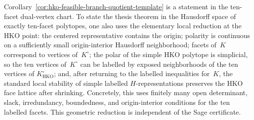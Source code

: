 \begin{remark}
\label{rem:hko-hausdorff-theorem-domain}
Corollary~\ref{cor:hko-feasible-branch-quotient-template} is a statement in the
ten-facet dual-vertex chart. To state the thesis theorem in the Hausdorff space
of exactly ten-facet polytopes, one also uses the elementary local reduction at
the HKO point: the centered representative contains the origin; polarity is
continuous on a sufficiently small origin-interior Hausdorff neighborhood;
facets of~$K$ correspond to vertices of~$K^\circ$; the polar of the simple HKO
polytope is simplicial, so the ten vertices of~$K^\circ$ can be labelled by
exposed neighborhoods of the ten vertices of $K_{\mathrm{HKO}}^\circ$; and,
after returning to the labelled inequalities for~$K$, the standard local
stability of simple labelled $H$-representations preserves the HKO face lattice
after shrinking. Concretely, this uses finitely many open determinant, slack,
irredundancy, boundedness, and origin-interior conditions for the ten labelled
facets. This geometric reduction is independent of the Sage certificate.
\end{remark}
